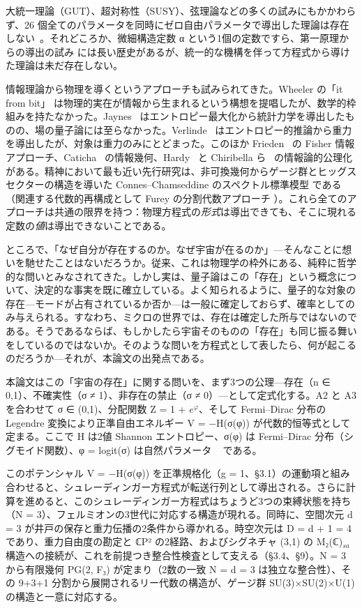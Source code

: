 \documentclass[fontsize=11pt,paper=a4,lualatex]{jlreq}
\begin{document}
大統一理論（GUT）、超対称性（SUSY）、弦理論などの多くの試みにもかかわらず、26 個全てのパラメータを同時にゼロ自由パラメータで導出した理論は存在しない~\cite{xing}。それどころか、微細構造定数 α という1個の定数ですら、第一原理からの導出の試み \cite{eddington,wyler,jentschura} には長い歴史があるが、統一的な機構を伴って方程式から導けた理論は未だ存在しない。

情報理論から物理を導くというアプローチも試みられてきた。Wheeler の「it from bit」\cite{wheeler} は物理的実在が情報から生まれるという構想を提唱したが、数学的枠組みを持たなかった。Jaynes~\cite{jaynes} はエントロピー最大化から統計力学を導出したものの、場の量子論には至らなかった。Verlinde~\cite{verlinde} はエントロピー的推論から重力を導出したが、対象は重力のみにとどまった。このほか Frieden~\cite{frieden} の Fisher 情報アプローチ、Caticha~\cite{caticha} の情報幾何、Hardy~\cite{hardy} と Chiribella ら~\cite{chiribella} の情報論的公理化がある。精神において最も近い先行研究は、非可換幾何からゲージ群とヒッグスセクターの構造を導いた Connes–Chamseddine のスペクトル標準模型 \cite{connes96,chamconnes96,ccm07} である（関連する代数的再構成として Furey の分割代数アプローチ \cite{furey}）。これら全てのアプローチは共通の限界を持つ：物理方程式の\emph{形式}は導出できても、そこに現れる定数の\emph{値}は導出できないことである。

ところで、「なぜ自分が存在するのか。なぜ宇宙が在るのか」---そんなことに想いを馳せたことはないだろうか。従来、これは物理学の枠外にある、純粋に哲学的な問いとみなされてきた。しかし実は、量子論はこの「存在」という概念について、決定的な事実を既に確立している。よく知られるように、量子的な対象の存在---モードが占有されているか否か---は一般に確定しておらず、確率としてのみ与えられる。すなわち、ミクロの世界では、存在は確定した所与ではないのである。そうであるならば、もしかしたら宇宙そのものの「存在」も同じ振る舞いをしているのではないか。そのような問いを方程式として表したら、何が起こるのだろうか---それが、本論文の出発点である。

本論文はこの「宇宙の存在」に関する問いを、まず3つの公理---存在（n ∈ {0,1}）、不確実性（σ ≠ 1）、非存在の禁止（σ ≠ 0）---として定式化する。A2 と A3 を合わせて σ ∈ (0,1)、分配関数 Z = 1 + $e^\varphi$、そして Fermi–Dirac 分布の Legendre 変換により正準自由エネルギー V = −H(σ(φ)) が代数的恒等式として定まる。ここで H は2値 Shannon エントロピー、σ(φ) は Fermi–Dirac 分布（シグモイド関数）、φ = logit(σ) は自然パラメータ ~\cite{amari,ay} である。

このポテンシャル V = −H(σ(φ)) を正準規格化（g = 1、§3.1）の運動項と組み合わせると、シュレーディンガー方程式が転送行列として導出される。さらに計算を進めると、このシュレーディンガー方程式はちょうど3つの束縛状態を持ち（N = 3）、フェルミオンの3世代に対応する構造が現れる。同時に、空間次元 d = 3 が井戸の保存と重力伝播の2条件から導かれる。時空次元は D = d + 1 = 4 であり、重力自由度の勘定と ℂP² の2経路、およびシグネチャ (3,1) の M₂(ℂ)$_{sa}$ 構造への接続が、これを前提つき整合性検査として支える（§3.4、§9）。N = 3 から有限幾何 PG(2, F₃) が定まり（2数の一致 N = d = 3 は独立な整合性）、その 9+3+1 分割から展開されるリー代数の構造が、ゲージ群 SU(3)×SU(2)×U(1) の構造と一意に対応する。
\end{document}

